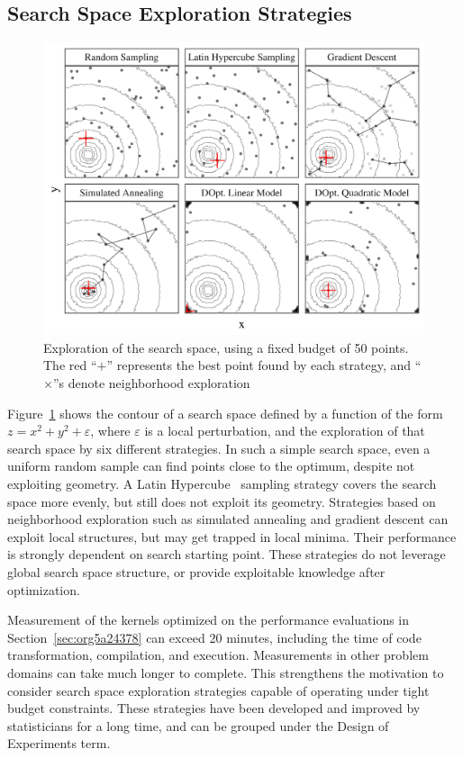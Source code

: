 \documentclass[conference]{IEEEtran}
\begin{document}
\subsection{Search Space Exploration Strategies}
\label{sec:org22b267d}
\begin{figure}[htbp]
\centering
\includegraphics[width=.95\columnwidth]{./img/sampling_comparison.pdf}
\caption{\label{fig:org0d76c7b}
Exploration of the search space, using a fixed budget of 50 points. The red ``\(+\)'' represents the best point found by each strategy, and ``\(\times\)''s denote neighborhood exploration}
\end{figure}

Figure~\ref{fig:org0d76c7b} shows the contour of a search space defined
by a function of the form \(z = x^2 + y^2 + \varepsilon\), where \(\varepsilon\) is
a local perturbation, and the exploration of that search space by six different
strategies. In such a simple search space, even a uniform random sample can find
points close to the optimum, despite not exploiting geometry. A Latin
Hypercube~\cite{carnell2018lhs} sampling strategy covers the search space
more evenly, but still does not exploit its geometry. Strategies based on
neighborhood exploration such as simulated annealing and gradient descent can
exploit local structures, but may get trapped in local minima. Their
performance is strongly dependent on search starting point. These strategies do
not leverage global search space structure, or provide exploitable knowledge
after optimization.

Measurement of the kernels optimized on the performance evaluations in
Section~\ref{sec:org5a24378} can exceed 20 minutes, including the time
of code transformation, compilation, and execution. Measurements in other
problem domains can take much longer to complete. This strengthens the motivation
to consider search space exploration strategies capable of operating under tight
budget constraints. These strategies have been developed and improved by
statisticians for a long time, and can be grouped under the Design of
Experiments term.
\end{document}
